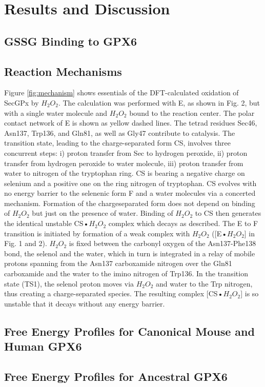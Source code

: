 \section{Results and Discussion}

\subsection{GSSG Binding to GPX6}

\subsection{Reaction Mechanisms}

Figure \ref{fig:mechanism} shows essentials of the DFT-calculated oxidation of SecGPx by $H_{2} O_{2}$. The calculation was performed with E, as shown in Fig. 2, but with a single water molecule and $H_{2} O_{2}$ bound to the reaction center. The polar contact network of E is shown as yellow dashed lines. The tetrad residues Sec46, Asn137, Trp136, and Gln81, as well as Gly47 contribute to catalysis. The transition state, leading to the charge-separated form CS, involves three concurrent steps: i) proton transfer from Sec to hydrogen peroxide, ii) proton transfer from hydrogen peroxide to water molecule, iii) proton transfer from water to nitrogen of the tryptophan ring. CS is bearing a negative charge on selenium and a positive one on the ring nitrogen of tryptophan. CS evolves with no energy barrier to the selenenic form F and a water molecules via a concerted mechanism. Formation of the chargeseparated form does not depend on binding of $H_{2} O_{2}$ but just on the presence of water. Binding of $H_{2} O_{2}$ to CS then generates the identical unstable CS•$H_{2} O_{2}$ complex which decays as described. The E to F transition is initiated by formation of a weak complex with $H_{2} O_{2}$ ([E•$H_{2} O_{2}$] in Fig. 1 and 2). $H_{2} O_{2}$ is fixed between the carbonyl oxygen of the Asn137-Phe138 bond, the selenol and the water, which in turn is integrated in a relay of mobile protons spanning from the Asn137 carboxamide nitrogen over the Gln81 carboxamide and the water to the imino nitrogen of Trp136. In the transition state (TS1), the selenol proton moves via $H_{2} O_{2}$ and water to the Trp nitrogen, thus creating a charge-separated species. The resulting complex [CS•$H_{2} O_{2}$] is so unstable that it decays without any energy barrier.\cite{orian_selenocysteine_2015}




\subsection{Free Energy Profiles for Canonical Mouse and Human GPX6}

\subsection{Free Energy Profiles for Ancestral GPX6}